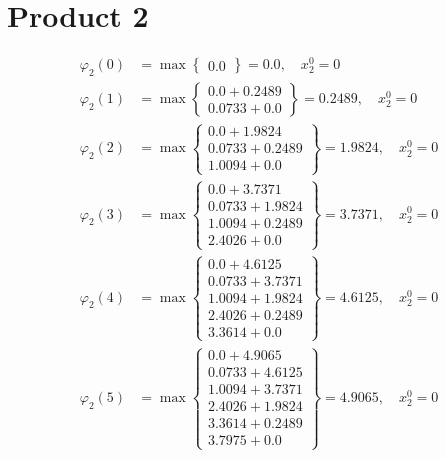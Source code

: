 \documentclass{article}
\begin{document}
\section{Product 2}
\begin{align*}
\varphi_{2}(0) &= \max \left\{ \begin{array}{c}
0.0
\end{array} \right\}=0.0, \quad x_{2}^0=0\\
  
\varphi_{2}(1) &= \max \left\{ \begin{array}{c}
0.0 + 0.2489 \\
 0.0733 + 0.0
\end{array} \right\}=0.2489, \quad x_{2}^0=0\\
  
\varphi_{2}(2) &= \max \left\{ \begin{array}{c}
0.0 + 1.9824 \\
 0.0733 + 0.2489 \\
 1.0094 + 0.0
\end{array} \right\}=1.9824, \quad x_{2}^0=0\\
  
\varphi_{2}(3) &= \max \left\{ \begin{array}{c}
0.0 + 3.7371 \\
 0.0733 + 1.9824 \\
 1.0094 + 0.2489 \\
 2.4026 + 0.0
\end{array} \right\}=3.7371, \quad x_{2}^0=0\\
  
\varphi_{2}(4) &= \max \left\{ \begin{array}{c}
0.0 + 4.6125 \\
 0.0733 + 3.7371 \\
 1.0094 + 1.9824 \\
 2.4026 + 0.2489 \\
 3.3614 + 0.0
\end{array} \right\}=4.6125, \quad x_{2}^0=0\\
  
\varphi_{2}(5) &= \max \left\{ \begin{array}{c}
0.0 + 4.9065 \\
 0.0733 + 4.6125 \\
 1.0094 + 3.7371 \\
 2.4026 + 1.9824 \\
 3.3614 + 0.2489 \\
 3.7975 + 0.0
\end{array} \right\}=4.9065, \quad x_{2}^0=0\\
  

\end{align*}
\end{document}
